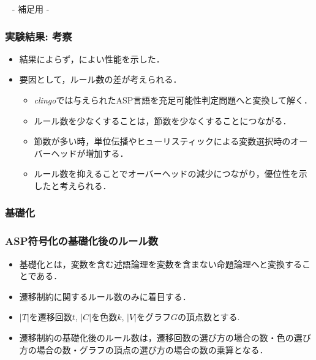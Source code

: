 \appendix
\backupbegin

\begin{frame}{~}
 \centering
 - 補足用 -
\end{frame} 

\begin{frame}\frametitle{実験結果: 考察}

  \begin{itemize}
    \item 結果によらず，によい性能を示した．
    \item 要因として，\alert{ルール数の差}が考えられる．
    \begin{itemize}
      \item \textit{clingo}では与えられたASP言語を充足可能性判定問題へと変換して解く．
      \item ルール数を少なくすることは，節数を少なくすることにつながる．
      \item 節数が多い時，単位伝播やヒューリスティックによる変数選択時のオーバーヘッドが増加する．
      \item ルール数を抑えることでオーバーヘッドの減少につながり，優位性を示したと考えられる．
    \end{itemize}
  \end{itemize}
  
\end{frame}

\begin{frame}\frametitle{基礎化}
  
\end{frame}

\begin{frame}\frametitle{ASP符号化の基礎化後のルール数}
  \begin{itemize}
    \item 基礎化とは，変数を含む述語論理を変数を含まない命題論理へと変換することである．
    \item 遷移制約に関するルール数のみに着目する．
    \item $|T|$を遷移回数$t$, $|C|$を色数$k$, $|V|$をグラフ$G$の頂点数とする.
  \end{itemize}


  \begin{itemize}
    \item 遷移制約の基礎化後のルール数は，遷移回数の選び方の場合の数・色の選び方の場合の数・グラフの頂点の選び方の場合の数の乗算となる．
  \end{itemize}
\end{frame}

